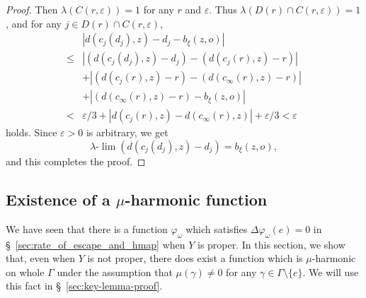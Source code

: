 \documentclass[12pt]{amsart}
\numberwithin{equation}{section}
\theoremstyle{plain}
\theoremstyle{definition}
\theoremstyle{remark}
\newcommand{\ulim}{\lambda{\text{-}}\!\lim}
\begin{document}
\begin{proof}
 Then $\lambda(C(r,\varepsilon))=1$ for any $r$ and $\varepsilon$. 
 Thus $\lambda(D(r) \cap C(r,\varepsilon))=1$,
and for any $j \in D(r) \cap C(r,\varepsilon)$,
\begin{equation*}
\begin{split}
  & |d(c_j(d_j), z)-d_j -
 b_{\xi}(z,o)| \\
  \leq &
  |\left(d(c_j(d_j), z)-d_j\right)
 - \left(d(c_j(r), z)-r\right)| \\
 & +|\left(d(c_j(r),z)-r\right)-
  \left(d(c_{\infty}(r), z)-r\right)| \\
 & + |\left(d(c_{\infty}(r), z)-r\right) -
 b_{\xi}(z,o)| \\
 < &  \varepsilon/3  + 
 |d(c_j(r), z)-d(c_{\infty}(r), z)| +
 \varepsilon/3 < \varepsilon
\end{split}
\end{equation*}
 holds.  Since $\varepsilon>0$ is arbitrary, we get
\begin{equation*}
 \ulim  \left(d(c_j(d_j), z) - d_j\right)
  = b_{\xi}(z,o), 
\end{equation*}
 and this completes the proof. 
\end{proof}

\subsection{Existence of a $\mu$-harmonic function}
\label{sec:global_harmonicity}

 We have seen that there is a function $\varphi_{\omega}$ which
 satisfies $\Delta \varphi_{\omega}(e)=0$ in
 \S~\ref{sec:rate_of_escape_and_hmap} when $Y$ is proper. 
 In this section, we show that, even when $Y$ is not proper,  
 there does exist a function which is $\mu$-harmonic on whole $\Gamma$
 under the assumption that $\mu(\gamma)\not= 0$ for any 
 $\gamma \in \Gamma \setminus \{e\}$. 
 We will use this fact in \S~\ref{sec:key-lemma-proof}. 
\end{document}

